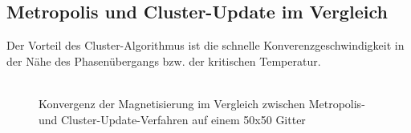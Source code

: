 \subsection{Metropolis und Cluster-Update im Vergleich}
Der Vorteil des Cluster-Algorithmus ist die schnelle Konverenzgeschwindigkeit in der Nähe des Phasenübergangs bzw. der kritischen Temperatur.\\\\

\begin{figure}[H]
	\centering
	\caption{Konvergenz der Magnetisierung im Vergleich zwischen Metropolis- und Cluster-Update-Verfahren auf einem 50x50 Gitter}
	\label{cu2d2steps}
\end{figure}

